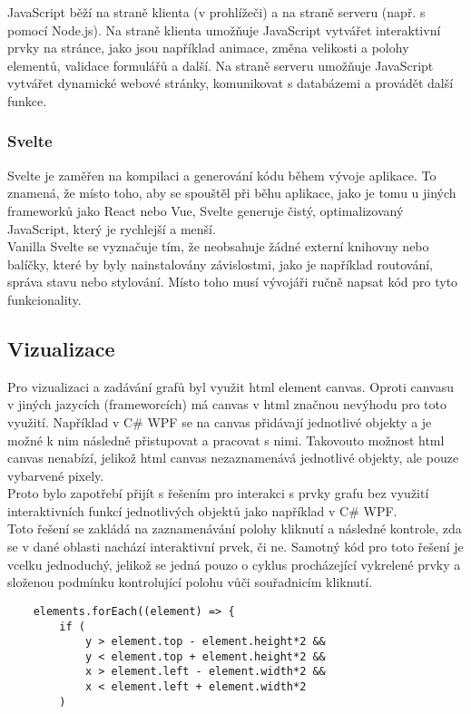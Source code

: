 \documentclass[12pt, titlepage, a4paper]{article}
\begin{document}
JavaScript běží na straně klienta (v prohlížeči) a na straně serveru (např. s pomocí Node.js). Na 
straně klienta umožňuje JavaScript vytvářet interaktivní prvky na stránce, jako jsou například 
animace, změna velikosti a polohy elementů, validace formulářů a další. Na straně serveru umožňuje 
JavaScript vytvářet dynamické webové stránky, komunikovat s databázemi a provádět další funkce.

\subsubsection{Svelte}
Svelte je zaměřen na kompilaci a generování kódu během vývoje aplikace. To znamená, že místo toho, 
aby se spouštěl při běhu aplikace, jako je tomu u jiných frameworků jako React nebo Vue, Svelte 
generuje čistý, optimalizovaný JavaScript, který je rychlejší a menší.
\\

Vanilla Svelte se vyznačuje tím, že neobsahuje žádné externí knihovny nebo balíčky, které by 
byly nainstalovány závislostmi, jako je například routování, správa stavu nebo stylování. Místo 
toho musí vývojáři ručně napsat kód pro tyto funkcionality.

\clearpage
\subsection{Vizualizace}
Pro vizualizaci a zadávání grafů byl využit html element canvas. Oproti 
canvasu v jiných jazycích (frameworcích) má canvas v html značnou nevýhodu
pro toto využití. Například v C\# WPF se na canvas přidávají jednotlivé objekty
a je možné k nim následně přistupovat a pracovat s nimi. Takovouto možnost html 
canvas nenabízí, jelikož html canvas nezaznamenává jednotlivé objekty, ale pouze
vybarvené pixely.
\\

Proto bylo zapotřebí přijít s řešením pro interakci s prvky grafu bez využití
interaktivních funkcí jednotlivých objektů jako například v C\# WPF.
\\

Toto řešení se zakládá na zaznamenávání polohy kliknutí a následné kontrole, zda
se v dané oblasti nachází interaktivní prvek, či ne. Samotný kód pro toto řešení
je vcelku jednoduchý, jelikož se jedná pouzo o cyklus procházející vykrelené prvky
a složenou podmínku kontrolující polohu vůči souřadnicím kliknutí.

\begin{lstlisting}
    elements.forEach((element) => {
        if (
            y > element.top - element.height*2 &&
            y < element.top + element.height*2 &&
            x > element.left - element.width*2 &&
            x < element.left + element.width*2
        )
\end{lstlisting}
\end{document}
